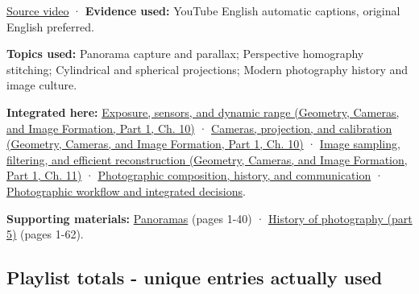 \hypertarget{04-visual-computing-ii-ch036-photo-18---photography-session-18}{}

\href{https://www.youtube.com/watch?v=fE0GQ9Tvn4U}{Source video} · \textbf{Evidence used:} YouTube English automatic captions, original English preferred.

\textbf{Topics used:} Panorama capture and parallax; Perspective homography stitching; Cylindrical and spherical projections; Modern photography history and image culture.

\textbf{Integrated here:} \href{../03-Geometry-Cameras-and-Image-Formation-P01/main.pdf\#nameddest=03-visual-computing-i-ch003-exposure-sensors-and-dynamic-range}{Exposure, sensors, and dynamic range (Geometry, Cameras, and Image Formation, Part 1, Ch. 10)} · \href{../03-Geometry-Cameras-and-Image-Formation-P01/main.pdf\#nameddest=03-visual-computing-i-ch003-cameras-projection-and-calibration}{Cameras, projection, and calibration (Geometry, Cameras, and Image Formation, Part 1, Ch. 10)} · \href{../03-Geometry-Cameras-and-Image-Formation-P01/main.pdf\#nameddest=03-visual-computing-i-ch004-image-sampling-filtering-and-efficient-reconstruction}{Image sampling, filtering, and efficient reconstruction (Geometry, Cameras, and Image Formation, Part 1, Ch. 11)} · \hyperref[04-visual-computing-ii-ch034-photographic-composition-history-and-communication]{Photographic composition, history, and communication} · \hyperref[04-visual-computing-ii-ch034-photographic-workflow-and-integrated-decisions]{Photographic workflow and integrated decisions}.

\textbf{Supporting materials:} \href{https://drive.google.com/open?id=0B6w2XfPHEcZYYVNCbmdFRUI1Zjg}{Panoramas} (pages 1-40) · \href{https://drive.google.com/open?id=0B6w2XfPHEcZYMU1OLTI2QUZQa1E}{History of photography (part 5)} (pages 1-62).

\subsection{Playlist totals - unique entries actually used}\label{04-visual-computing-ii-ch036-playlist-totals---unique-entries-actually-used}

\hypertarget{04-visual-computing-ii-ch036-playlist-totals---unique-entries-actually-used}{}

